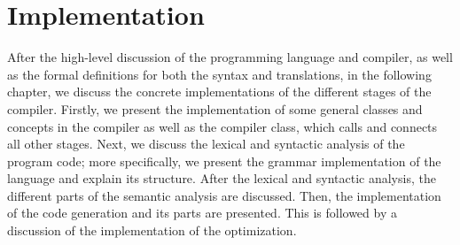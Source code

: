 \chapter{Implementation}
\label{ch:implementation}
After the high-level discussion of the programming language and compiler, as well as the formal definitions for both the syntax and translations, in the following chapter, we discuss the concrete implementations of the different stages of the compiler. Firstly, we present the implementation of some general classes and concepts in the compiler as well as the compiler class, which calls and connects all other stages. Next, we discuss the lexical and syntactic analysis of the program code; more specifically, we present the grammar implementation of the language and explain its structure. After the lexical and syntactic analysis, the different parts of the semantic analysis are discussed. Then, the implementation of the code generation and its parts are presented. This is followed by a discussion of the implementation of the optimization. 









